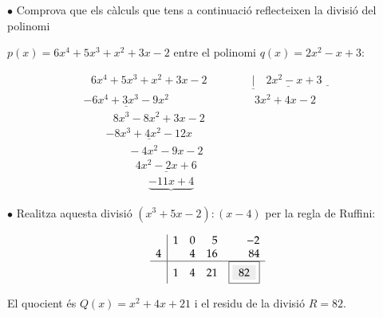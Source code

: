 \begin{example}
 	$\bullet$ Comprova que els càlculs que tens a continuació reflecteixen la divisió del polinomi
	
	 $p(x)=6x^{4} +5x^{3} +x^{2} +3x-2$ entre el polinomi $q(x)=2x^{2} -x+3$:
	
	
	\[ \begin{array}{l} {\, \, \, \, 6x^{4} +5x^{3} +x^{2} +3x-2\quad \quad \quad \quad \underline{|}\underline{\quad 2x^{2} -x+3}\underline{\quad }} \\ {\underline{-6x^{4} +3x^{3} -9x^{2} }\, \, \, \, \, \, \, \, \, \, \, \, \, \, \, \, \, \, \, \, \, \, \, \, \, \, \, \, \, \, \, \, \, \, \, \, \, \, \, \, \quad 3x^{2} +4x-2\, } \\ {\, \, \, \, \, \, \, \, \, \, \, \, \, \, \, \, 8x^{3} -8x^{2} +3x-2} \\ {\, \, \, \, \, \, \, \, \, \, \, \, \underline{-8x^{3} +4x^{2} -12x}} \\ {\, \, \, \, \, \, \, \, \, \, \, \, \, \, \, \, \, \, \, \, \, \, \, \, -4x^{2} -9x-2} \\ {\, \, \, \, \, \, \, \, \, \, \, \, \, \, \, \, \, \, \, \, \, \, \, \, \, \, \, \, \underline{4x^{2} -2x+6}} \\ {\, \, \, \, \, \, \, \, \, \, \, \, \, \, \, \, \, \, \, \, \, \, \, \, \, \, \, \, \, \, \, \, \, \, \, \underbrace{-11x+4} } \end{array} \]
	
	
	$\bullet$ Realitza aquesta divisió $(x^3+5x-2) : (x-4)$ per la regla de Ruffini:
	
	\[ \begin{array}{r|rrrr}  & 1 & 0 & 5 & -2\\ 4 &  & 4 & 16 & 84 \\ \hline  & 1 & 4 & 21 & \examplebox{ 82 }\end{array} \]
	
	El quocient és $Q(x)=x^2+4x+21$ i el residu de la divisió $R=82$.
	\end{example}


